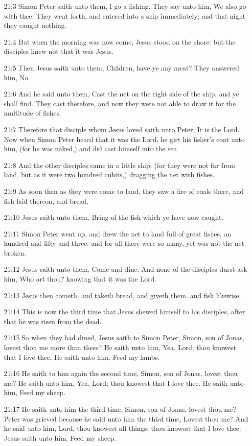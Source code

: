 21:3 Simon Peter saith unto them, I go a fishing. They say unto him,
We also go with thee. They went forth, and entered into a ship
immediately; and that night they caught nothing.

21:4 But when the morning was now come, Jesus stood on the shore: but
the disciples knew not that it was Jesus.

21:5 Then Jesus saith unto them, Children, have ye any meat? They
answered him, No.

21:6 And he said unto them, Cast the net on the right side of the
ship, and ye shall find. They cast therefore, and now they were not
able to draw it for the multitude of fishes.

21:7 Therefore that disciple whom Jesus loved saith unto Peter, It is
the Lord. Now when Simon Peter heard that it was the Lord, he girt his
fisher's coat unto him, (for he was naked,) and did cast himself into
the sea.

21:8 And the other disciples came in a little ship; (for they were not
far from land, but as it were two hundred cubits,) dragging the net
with fishes.

21:9 As soon then as they were come to land, they saw a fire of coals
there, and fish laid thereon, and bread.

21:10 Jesus saith unto them, Bring of the fish which ye have now
caught.

21:11 Simon Peter went up, and drew the net to land full of great
fishes, an hundred and fifty and three: and for all there were so
many, yet was not the net broken.

21:12 Jesus saith unto them, Come and dine. And none of the disciples
durst ask him, Who art thou? knowing that it was the Lord.

21:13 Jesus then cometh, and taketh bread, and giveth them, and fish
likewise.

21:14 This is now the third time that Jesus shewed himself to his
disciples, after that he was risen from the dead.

21:15 So when they had dined, Jesus saith to Simon Peter, Simon, son
of Jonas, lovest thou me more than these? He saith unto him, Yea,
Lord; thou knowest that I love thee. He saith unto him, Feed my lambs.

21:16 He saith to him again the second time, Simon, son of Jonas,
lovest thou me? He saith unto him, Yea, Lord; thou knowest that I love
thee. He saith unto him, Feed my sheep.

21:17 He saith unto him the third time, Simon, son of Jonas, lovest
thou me? Peter was grieved because he said unto him the third time,
Lovest thou me? And he said unto him, Lord, thou knowest all things;
thou knowest that I love thee. Jesus saith unto him, Feed my sheep.

